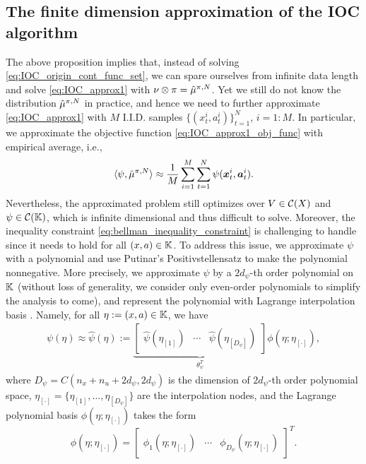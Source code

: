 \subsection{The finite dimension approximation of the IOC algorithm}\label{sec:finite-dim-ioc}
The above proposition implies that, instead of solving \eqref{eq:IOC_origin_cont_func_set}, we can spare ourselves from infinite data length and solve \eqref{eq:IOC_approx1} with $\nu\otimes\relax{\pi}=\hat{\mu}^{\relax{\pi},N}$. Yet we still do not know the distribution $\hat{\mu}^{\relax{\pi},N}$ in practice, and hence we need to further approximate \eqref{eq:IOC_approx1} with $M$ I.I.D. samples $\{(x_t^i,a_t^i)\}_{t=1}^N$, $i=1:M$. In particular, we approximate the objective function \eqref{eq:IOC_approx1_obj_func} with empirical average, i.e.,
\begin{align}
  \langle\psi,\hat{\mu}^{\relax{\pi},N} \rangle\approx\frac{1}{M}\sum_{i=1}^M\sum_{t=1}^N\psi(\bm{x}_t^i,\bm{a}_t^i).
  \label{eq:emphirical_average}
\end{align}
Nevertheless, the approximated problem still optimizes over $V\in\mathcal{C}(X)$ and $\psi\in\mathcal{C}(\mathbb{K})$, which is infinite dimensional and thus difficult to solve. Moreover, the inequality constraint \eqref{eq:bellman_inequality_constraint} is challenging to handle since it needs to hold for all $(x,a)\in\mathbb{K}$.
To address this issue, we approximate $\psi$ with a polynomial and use Putinar's Positivstellensatz \citep{putinar1993positive}\citep[Thm.~3.20]{laurent2009sums} to make the polynomial nonnegative.
More precisely, we approximate $\psi$ by a $2d_\psi$-th order polynomial on $\mathbb{K}$ (without loss of generality, we consider only even-order polynomials to simplify the analysis to come), and represent the polynomial with Lagrange interpolation basis \citep{sauer1995multivariate}. Namely, for all $\eta := (x,a)\in\mathbb{K}$, we have
\begin{align}\label{eq:polynomial_approx}
    \psi(\eta)\approx \hat{\psi}(\eta):= \underbrace{
    \begin{bmatrix}
    \hat\psi(\eta_{[1]}) &\cdots &\hat\psi(\eta_{[D_\psi]})
    \end{bmatrix}
    }_{\theta_\psi^T}\phi(\eta;\eta_{[\cdot]}),
\end{align}
where $D_\psi = C(n_x+n_u+2d_\psi, 2d_\psi)$ is the dimension of $2d_{\psi}$-th order polynomial space, $\eta_{[\cdot]}=\{\eta_{[1]},\ldots,\eta_{[D_\psi]}\}$ are the interpolation nodes, and the Lagrange polynomial basis $\phi(\eta;\eta_{[\cdot]})$ takes the form
\[
\phi(\eta;\eta_{[\cdot]}) = 
\begin{bmatrix}
\phi_1(\eta;\eta_{[\cdot]}) &\cdots &\phi_{D_\psi}(\eta;\eta_{[\cdot]})
\end{bmatrix}^T.
\]

